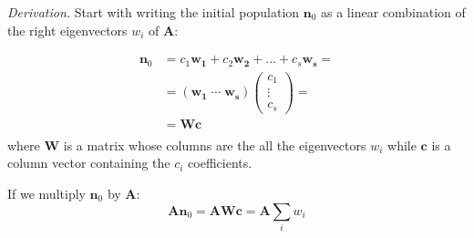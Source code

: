\documentclass[\main/main.tex]{subfiles}
\begin{document}
\noindent \textit{Derivation.} Start with writing the initial population $\mathbf{n}_0$ as a linear combination of the right eigenvectors $w_i$ of $\mathbf{A}$:

\begin{equation}
\begin{split}
    \mathbf{n}_0 &= c_1 \mathbf{w_1} + c_2 \mathbf{w_2} + ... + c_s \mathbf{w_s} = \\
    &= (\mathbf{w_1} \; \cdots \; \mathbf{w_s})
\begin{pmatrix}
c_1 \\ \vdots \\c_s
\end{pmatrix}  =\\
&= \mathbf{Wc}\\
\end{split}
\end{equation}
where $\mathbf{W}$ is a matrix whose columns are the all the eigenvectors $w_i$ while $\mathbf{c}$ is a column vector containing the $c_i$ coefficients.

If we multiply $\mathbf{n}_0$ by $\mathbf{A}$:
\begin{equation}
    \mathbf{A} \mathbf{n}_0 = \mathbf{A} \mathbf{Wc} = \mathbf{A}  \sum_{i} w_i
\end{equation}
\end{document}
